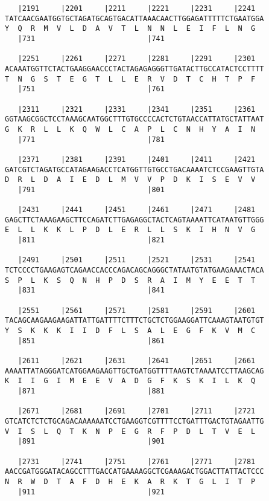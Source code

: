 \documentclass{article}
\begin{document}
\begin{Verbatim}
   |2191     |2201     |2211     |2221     |2231     |2241  
TATCAACGAATGGTGCTAGATGCAGTGACATTAAACAACTTGGAGATTTTTCTGAATGGA
Y  Q  R  M  V  L  D  A  V  T  L  N  N  L  E  I  F  L  N  G  
   |731                          |741                       
  
   |2251     |2261     |2271     |2281     |2291     |2301  
ACAAATGGTTCTACTGAAGGAACCCTACTAGAGAGGGTTGATACTTGCCATACTCCTTTT
T  N  G  S  T  E  G  T  L  L  E  R  V  D  T  C  H  T  P  F  
   |751                          |761                       
  
   |2311     |2321     |2331     |2341     |2351     |2361  
GGTAAGCGGCTCCTAAAGCAATGGCTTTGTGCCCCACTCTGTAACCATTATGCTATTAAT
G  K  R  L  L  K  Q  W  L  C  A  P  L  C  N  H  Y  A  I  N  
   |771                          |781                       
  
   |2371     |2381     |2391     |2401     |2411     |2421  
GATCGTCTAGATGCCATAGAAGACCTCATGGTTGTGCCTGACAAAATCTCCGAAGTTGTA
D  R  L  D  A  I  E  D  L  M  V  V  P  D  K  I  S  E  V  V  
   |791                          |801                       
  
   |2431     |2441     |2451     |2461     |2471     |2481  
GAGCTTCTAAAGAAGCTTCCAGATCTTGAGAGGCTACTCAGTAAAATTCATAATGTTGGG
E  L  L  K  K  L  P  D  L  E  R  L  L  S  K  I  H  N  V  G  
   |811                          |821                       
  
   |2491     |2501     |2511     |2521     |2531     |2541  
TCTCCCCTGAAGAGTCAGAACCACCCAGACAGCAGGGCTATAATGTATGAAGAAACTACA
S  P  L  K  S  Q  N  H  P  D  S  R  A  I  M  Y  E  E  T  T  
   |831                          |841                       
  
   |2551     |2561     |2571     |2581     |2591     |2601  
TACAGCAAGAAGAAGATTATTGATTTTCTTTCTGCTCTGGAAGGATTCAAAGTAATGTGT
Y  S  K  K  K  I  I  D  F  L  S  A  L  E  G  F  K  V  M  C  
   |851                          |861                       
  
   |2611     |2621     |2631     |2641     |2651     |2661  
AAAATTATAGGGATCATGGAAGAAGTTGCTGATGGTTTTAAGTCTAAAATCCTTAAGCAG
K  I  I  G  I  M  E  E  V  A  D  G  F  K  S  K  I  L  K  Q  
   |871                          |881                       
  
   |2671     |2681     |2691     |2701     |2711     |2721  
GTCATCTCTCTGCAGACAAAAAATCCTGAAGGTCGTTTTCCTGATTTGACTGTAGAATTG
V  I  S  L  Q  T  K  N  P  E  G  R  F  P  D  L  T  V  E  L  
   |891                          |901                       
  
   |2731     |2741     |2751     |2761     |2771     |2781  
AACCGATGGGATACAGCCTTTGACCATGAAAAGGCTCGAAAGACTGGACTTATTACTCCC
N  R  W  D  T  A  F  D  H  E  K  A  R  K  T  G  L  I  T  P  
   |911                          |921                       
  

\end{Verbatim}
\end{document}
